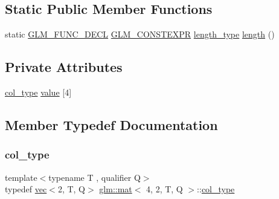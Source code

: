 \subsection*{Static Public Member Functions}
\begin{DoxyCompactItemize}
\item 
static \hyperlink{setup_8hpp_ab2d052de21a70539923e9bcbf6e83a51}{G\+L\+M\+\_\+\+F\+U\+N\+C\+\_\+\+D\+E\+CL} \hyperlink{setup_8hpp_a08b807947b47031d3a511f03f89645ad}{G\+L\+M\+\_\+\+C\+O\+N\+S\+T\+E\+X\+PR} \hyperlink{structglm_1_1mat_3_014_00_012_00_01_t_00_01_q_01_4_a4b192a2630331f70ca61657d9783026e}{length\+\_\+type} \hyperlink{structglm_1_1mat_3_014_00_012_00_01_t_00_01_q_01_4_ab3b1d2d2d45c52698509f170c3e0d866}{length} ()
\end{DoxyCompactItemize}
\subsection*{Private Attributes}
\begin{DoxyCompactItemize}
\item 
\hyperlink{structglm_1_1mat_3_014_00_012_00_01_t_00_01_q_01_4_a60138ab077eb3bef96e654e672af5059}{col\+\_\+type} \hyperlink{structglm_1_1mat_3_014_00_012_00_01_t_00_01_q_01_4_aa505bcd34286dbc23f599a6510908853}{value} \mbox{[}4\mbox{]}
\end{DoxyCompactItemize}


\subsection{Member Typedef Documentation}
\mbox{\label{structglm_1_1mat_3_014_00_012_00_01_t_00_01_q_01_4_a60138ab077eb3bef96e654e672af5059}} 
\subsubsection{\texorpdfstring{col\+\_\+type}{col\_type}}
{\footnotesize\ttfamily template$<$typename T , qualifier Q$>$ \\
typedef \hyperlink{structglm_1_1vec}{vec}$<$2, T, Q$>$ \hyperlink{structglm_1_1mat}{glm\+::mat}$<$ 4, 2, T, Q $>$\+::\hyperlink{structglm_1_1mat_3_014_00_012_00_01_t_00_01_q_01_4_a60138ab077eb3bef96e654e672af5059}{col\+\_\+type}}


